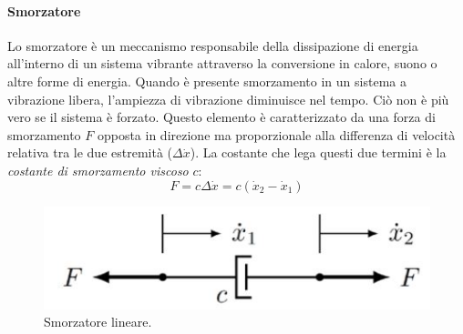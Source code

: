 \paragraph{Smorzatore} Lo smorzatore è un meccanismo responsabile della dissipazione di energia all'interno di un sistema vibrante attraverso la conversione in calore, suono o altre forme di energia. Quando è presente smorzamento in un sistema a vibrazione libera, l'ampiezza di vibrazione diminuisce nel tempo. Ciò non è più vero se il sistema è forzato. 
Questo elemento è caratterizzato da una forza di smorzamento $F$ opposta in direzione ma proporzionale alla differenza di velocità relativa tra le due estremità ($\Delta \dot x$). La costante che lega questi due termini è la \textit{costante di smorzamento viscoso} $c$:
\begin{equation}
    F=c \Delta \dot x= c(\dot x_2-\dot x_1)
\end{equation}
\begin{figure}[h]
    \centering
    \includegraphics[scale=0.6]{SmorzatoreLineare.JPG}
    \caption{Smorzatore lineare.}
    \label{SmorzatoreLineare}
\end{figure}








